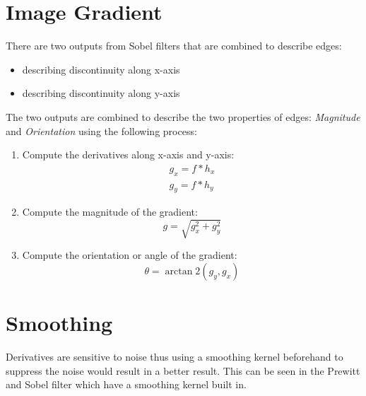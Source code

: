 \documentclass{report}
\begin{document}
\section{Image Gradient}

There are two outputs from Sobel filters that are combined to describe edges:
\begin{itemize}
    \item describing discontinuity along x-axis
    \item describing discontinuity along y-axis
\end{itemize}

The two outputs are combined to describe the two properties of edges: \textit{Magnitude} 
and \textit{Orientation} using the following process:
\begin{enumerate}
    \item Compute the derivatives along x-axis and y-axis:
    \begin{align*}
        g_x = f * h_x \\
        g_y = f * h_y
    \end{align*}
        
    \item Compute the magnitude of the gradient:
    $$
        g = \sqrt{g_x^2 + g_y^2}
    $$

    \item Compute the orientation or angle of the gradient:
    $$
        \theta = \arctan2(g_y, g_x)
    $$
\end{enumerate}

\section{Smoothing}

Derivatives are sensitive to noise thus using a smoothing kernel beforehand to
suppress the noise would result in a better result. This can be seen in the
Prewitt and Sobel filter which have a smoothing kernel built in. 
\end{document}
